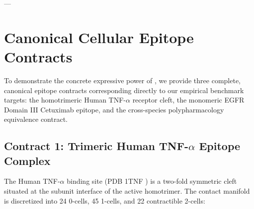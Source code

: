 ---

\section{Canonical Cellular Epitope Contracts}
\label{sec:canonical_contracts}

To demonstrate the concrete expressive power of \ToposLang{}, we provide three complete, canonical epitope contracts corresponding directly to our empirical benchmark targets: the homotrimeric Human TNF-$\alpha$ receptor cleft, the monomeric EGFR Domain III Cetuximab epitope, and the cross-species polypharmacology equivalence contract.

\subsection{Contract 1: Trimeric Human TNF-\texorpdfstring{$\alpha$}{Alpha} Epitope Complex}
The Human TNF-$\alpha$ binding site (PDB 1TNF \cite{eck1989structure}) is a two-fold symmetric cleft situated at the subunit interface of the active homotrimer. The contact manifold is discretized into 24 0-cells, 45 1-cells, and 22 contractible 2-cells:

